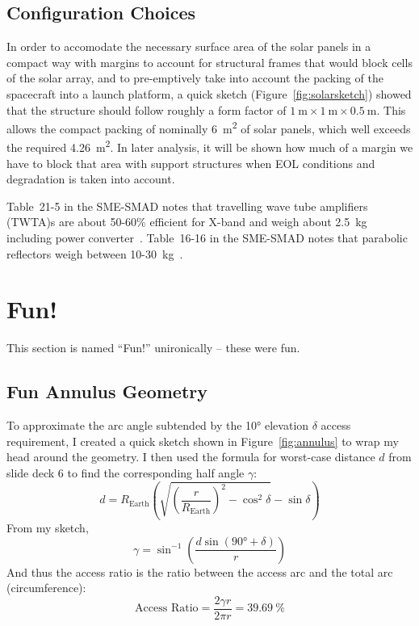 \documentclass[9pt]{article}
\begin{document}
\subsection{Configuration Choices}
In order to accomodate the necessary surface area of the solar panels in a compact way with margins to account for structural frames that would block cells of the solar array, and to pre-emptively take into account the packing of the spacecraft into a launch platform, a quick sketch (Figure~\ref{fig:solarsketch}) showed that the structure should follow roughly a form factor of $\SI{1}{\meter}\times\SI{1}{\meter}\times\SI{0.5}{\meter}$.
This allows the compact packing of nominally \SI{6}{\square\meter} of solar panels, which well exceeds the required \SI{4.26}{\square\meter}.
In later analysis, it will be shown how much of a margin we have to block that area with support structures when EOL conditions and degradation is taken into account.

Table~21-5 in the SME-SMAD notes that travelling wave tube amplifiers (TWTA)s are about 50-60\% efficient for X-band and weigh about \qty{2.5}{\kilo\gram} including power converter~\cite[p. 637]{sme}.
Table~16-16 in the SME-SMAD notes that parabolic reflectors weigh between 10-30~kg~\cite[p. 484]{sme}.

\clearpage
\section{Fun!}
This section is named ``Fun!'' unironically -- these were fun.

\subsection{Fun Annulus Geometry}\label{app:annulus}
To approximate the arc angle subtended by the \ang{10} elevation $\delta$ access requirement, I created a quick sketch shown in Figure~\ref{fig:annulus} to wrap my head around the geometry.
I then used the formula for worst-case distance $d$ from slide deck 6 to find the corresponding half angle $\gamma$:
\begin{equation}
  d=R_\text{Earth}\left(
    \sqrt{\left(\frac{r}{R_\text{Earth}}\right)^2-\cos^2\delta}
    -\sin\delta
  \right)
\end{equation}
From my sketch,
\begin{equation}
  \gamma = \sin^{-1}\left(\frac{d\sin(\ang{90}+\delta)}{r}\right)
\end{equation}
And thus the access ratio is the ratio between the access arc and the total arc (circumference):
\begin{equation}
  \text{Access Ratio} = \frac{2\gamma r}{2\pi r} = \qty{39.69}{\percent}
\end{equation}
\end{document}
